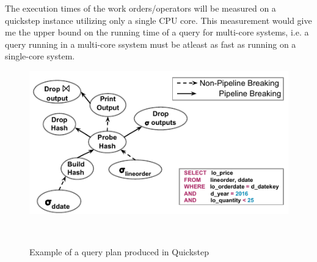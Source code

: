 \documentclass[20pt]{sigchi}
\begin{document}
The execution times of the work orders/operators will be measured on a quickstep instance utilizing only a single CPU core. This measurement would give me the upper bound on the running time of a query for multi-core systems, i.e. a query running in a multi-core ssystem must be atleast as fast as running on a single-core system.
\begin{figure}

\centering
  \includegraphics[width=0.9\columnwidth]{figures/QueryPlan}

  \caption{Example of a  query plan produced in Quickstep}~\label{fig:figure1}
  \vspace{-2.0em}
\end{figure}





\end{document}
